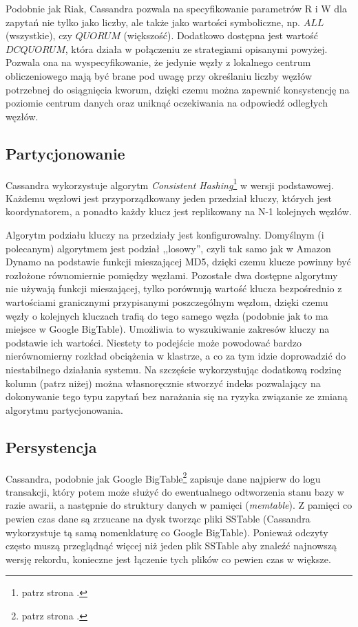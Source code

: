 Podobnie jak Riak, Cassandra pozwala na specyfikowanie parametrów R i W dla zapytań nie tylko jako liczby, ale także jako wartości symboliczne, np. $ALL$ (wszystkie), czy $QUORUM$ (większość).
Dodatkowo dostępna jest wartość $DCQUORUM$, która działa w połączeniu ze strategiami opisanymi powyżej.
Pozwala ona na wyspecyfikowanie, że jedynie węzły z lokalnego centrum obliczeniowego mają być brane pod uwagę przy określaniu liczby węzłów potrzebnej do osiągnięcia kworum, dzięki czemu można zapewnić konsystencję na poziomie centrum danych oraz uniknąć oczekiwania na odpowiedź odległych węzłów.

\subsection*{Partycjonowanie}

Cassandra wykorzystuje algorytm \emph{Consistent Hashing}\footnote{patrz strona \pageref{sec:dynamo-consistent-hashing}.} w wersji podstawowej.
Każdemu węzłowi jest przyporządkowany jeden przedział kluczy, których jest koordynatorem, a ponadto każdy klucz jest replikowany na N-1 kolejnych węzłów.

Algorytm podziału kluczy na przedziały jest konfigurowalny.
Domyślnym (i polecanym) algorytmem jest podział ,,losowy'', czyli tak samo jak w Amazon Dynamo na podstawie funkcji mieszającej MD5, dzięki czemu klucze powinny być rozłożone równomiernie pomiędzy węzłami.
Pozostałe dwa dostępne algorytmy nie używają funkcji mieszającej, tylko porównują wartość klucza bezpośrednio z wartościami granicznymi przypisanymi poszczególnym węzłom, dzięki czemu węzły o kolejnych kluczach trafią do tego samego węzła (podobnie jak to ma miejsce w Google BigTable).
Umożliwia to wyszukiwanie zakresów kluczy na podstawie ich wartości.
Niestety to podejście może powodować bardzo nierównomierny rozkład obciążenia w klastrze, a co za tym idzie doprowadzić do niestabilnego działania systemu.
Na szczęście wykorzystując dodatkową rodzinę kolumn (patrz niżej) można własnoręcznie stworzyć indeks pozwalający na dokonywanie tego typu zapytań bez narażania się na ryzyka związanie ze zmianą algorytmu partycjonowania.

\subsection*{Persystencja}

Cassandra, podobnie jak Google BigTable\footnote{patrz strona \pageref{sec:bigtable-architektura-serwera-tabletow}.} zapisuje dane najpierw do logu transakcji, który potem może służyć do ewentualnego odtworzenia stanu bazy w razie awarii, a następnie do struktury danych w pamięci (\emph{memtable}).
Z pamięci co pewien czas dane są zrzucane na dysk tworząc pliki SSTable (Cassandra wykorzystuje tą samą nomenklaturę co Google BigTable).
Ponieważ odczyty często muszą przeglądnąć więcej niż jeden plik SSTable aby znaleźć najnowszą wersję rekordu, konieczne jest łączenie tych plików co pewien czas w większe.

